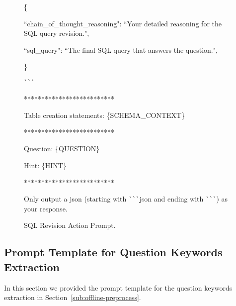 \begin{figure}[t!]
\begin{tcolorbox}
\{

  ``chain\_of\_thought\_reasoning": ``Your detailed reasoning for the SQL query revision.",
  
  ``sql\_query": ``The final SQL query that answers the question.",
  
\}

\verb|```|

**************************

Table creation statements:
\{SCHEMA\_CONTEXT\}

**************************

Question: 
\{QUESTION\}

Hint:
\{HINT\}

**************************

Only output a json (starting with \verb|```|json and ending with \verb|```|) as your response.
    
    \end{tcolorbox}
    \caption{SQL Revision Action Prompt.}
    \label{fig:prompt-sql-revision}
\end{figure}


\newpage
\clearpage



\subsection{Prompt Template for Question Keywords Extraction}
\label{sub:keyword-extraction-prompts}

In this section we provided the prompt template for the question keywords extraction in Section~\ref{sub:offline-preprocess}.

